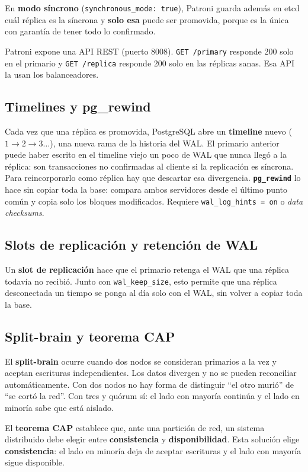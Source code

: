 \documentclass[11pt,a4paper]{article}
\newcommand{\cod}[1]{\texttt{#1}}
\begin{document}
En \textbf{modo síncrono} (\cod{synchronous\_mode: true}), Patroni guarda además en etcd cuál réplica es la síncrona y \textbf{solo esa} puede ser promovida, porque es la única con garantía de tener todo lo confirmado.

Patroni expone una API REST (puerto 8008). \cod{GET /primary} responde 200 solo en el primario y \cod{GET /replica} responde 200 solo en las réplicas sanas. Esa API la usan los balanceadores.

\subsection{Timelines y pg\_rewind}

Cada vez que una réplica es promovida, PostgreSQL abre un \textbf{timeline} nuevo ($1 \rightarrow 2 \rightarrow 3 \ldots$), una nueva rama de la historia del WAL. El primario anterior puede haber escrito en el timeline viejo un poco de WAL que nunca llegó a la réplica: son transacciones no confirmadas al cliente si la replicación es síncrona. Para reincorporarlo como réplica hay que descartar esa divergencia. \textbf{\cod{pg\_rewind}} lo hace sin copiar toda la base: compara ambos servidores desde el último punto común y copia solo los bloques modificados. Requiere \cod{wal\_log\_hints = on} o \emph{data checksums}.

\subsection{Slots de replicación y retención de WAL}

Un \textbf{slot de replicación} hace que el primario retenga el WAL que una réplica todavía no recibió. Junto con \cod{wal\_keep\_size}, esto permite que una réplica desconectada un tiempo se ponga al día solo con el WAL, sin volver a copiar toda la base.

\subsection{Split-brain y teorema CAP}

El \textbf{split-brain} ocurre cuando dos nodos se consideran primarios a la vez y aceptan escrituras independientes. Los datos divergen y no se pueden reconciliar automáticamente. Con dos nodos no hay forma de distinguir ``el otro murió'' de ``se cortó la red''. Con tres y quórum sí: el lado con mayoría continúa y el lado en minoría sabe que está aislado.

El \textbf{teorema CAP} establece que, ante una partición de red, un sistema distribuido debe elegir entre \textbf{consistencia} y \textbf{disponibilidad}. Esta solución elige \textbf{consistencia}: el lado en minoría deja de aceptar escrituras y el lado con mayoría sigue disponible.
\end{document}
